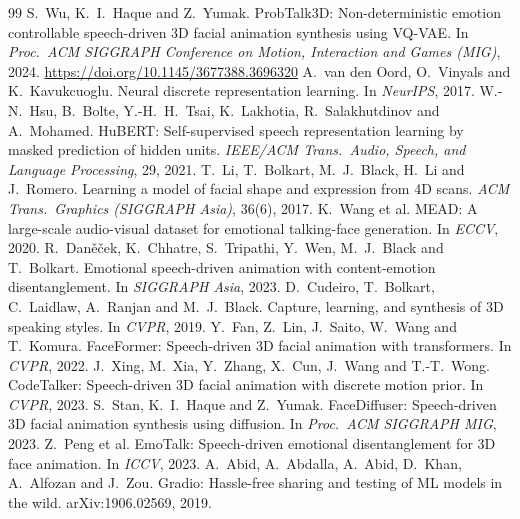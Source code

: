 \documentclass[10pt,twocolumn,letterpaper]{article}
\begin{document}
\begin{thebibliography}{99}\small
\setlength{\itemsep}{1pt}
 S.~Wu, K.~I.~Haque and Z.~Yumak. ProbTalk3D: Non-deterministic emotion controllable speech-driven 3D facial animation synthesis using VQ-VAE. In \emph{Proc.\ ACM SIGGRAPH Conference on Motion, Interaction and Games (MIG)}, 2024. \url{https://doi.org/10.1145/3677388.3696320}
 A.~van den Oord, O.~Vinyals and K.~Kavukcuoglu. Neural discrete representation learning. In \emph{NeurIPS}, 2017.
 W.-N.~Hsu, B.~Bolte, Y.-H.~H.~Tsai, K.~Lakhotia, R.~Salakhutdinov and A.~Mohamed. HuBERT: Self-supervised speech representation learning by masked prediction of hidden units. \emph{IEEE/ACM Trans.\ Audio, Speech, and Language Processing}, 29, 2021.
 T.~Li, T.~Bolkart, M.~J.~Black, H.~Li and J.~Romero. Learning a model of facial shape and expression from 4D scans. \emph{ACM Trans.\ Graphics (SIGGRAPH Asia)}, 36(6), 2017.
 K.~Wang et al. MEAD: A large-scale audio-visual dataset for emotional talking-face generation. In \emph{ECCV}, 2020.
 R.~Dan\v{e}\v{c}ek, K.~Chhatre, S.~Tripathi, Y.~Wen, M.~J.~Black and T.~Bolkart. Emotional speech-driven animation with content-emotion disentanglement. In \emph{SIGGRAPH Asia}, 2023.
 D.~Cudeiro, T.~Bolkart, C.~Laidlaw, A.~Ranjan and M.~J.~Black. Capture, learning, and synthesis of 3D speaking styles. In \emph{CVPR}, 2019.
 Y.~Fan, Z.~Lin, J.~Saito, W.~Wang and T.~Komura. FaceFormer: Speech-driven 3D facial animation with transformers. In \emph{CVPR}, 2022.
 J.~Xing, M.~Xia, Y.~Zhang, X.~Cun, J.~Wang and T.-T.~Wong. CodeTalker: Speech-driven 3D facial animation with discrete motion prior. In \emph{CVPR}, 2023.
 S.~Stan, K.~I.~Haque and Z.~Yumak. FaceDiffuser: Speech-driven 3D facial animation synthesis using diffusion. In \emph{Proc.\ ACM SIGGRAPH MIG}, 2023.
 Z.~Peng et al. EmoTalk: Speech-driven emotional disentanglement for 3D face animation. In \emph{ICCV}, 2023.
 A.~Abid, A.~Abdalla, A.~Abid, D.~Khan, A.~Alfozan and J.~Zou. Gradio: Hassle-free sharing and testing of ML models in the wild. arXiv:1906.02569, 2019.
\end{thebibliography}
\end{document}
